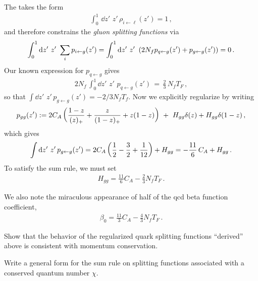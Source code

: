 \begin{example}
    The  takes the form
    \begin{align}
        \int_0^1\,\dd z'\,\, z'\,\rho_{i\leftarrow\ell}(z') = 1
        \,,
    \end{align}
    and therefore constrains the \textit{gluon splitting functions} via
\begin{align}
    \int_0^1 \dd z'
    \,\,
    z'
    \,\,
    \sum_i
    p_{i \leftarrow g}(z')
    =
    \int_0^1 \dd z'
    \,\,
    z'
    \,\,
    \left(
        2 N_f p_{q \leftarrow g}(z')
        +
        p_{g\leftarrow g}(z')
    \right)
    = 0
    \,.
\end{align}
%
Our known expression for \(p_{q\leftarrow g}\) gives
\begin{align}
    2 N_f \,\int_0^1 \dd z'\,\, z'\,\, p_{q \leftarrow g}(z')
    \,
    =
    \,
    \frac{2}{3}\,N_f T_F
    \,,
\end{align}
so that \(\int \dd z'\,\, z'\,p_{g\leftarrow g}(z') = -2/3 N_f T_f \).
%
Now we explicitly regularize by writing
\begin{align}
    p_{gg}(z')
    :=
    2 C_A \left(
        \frac{1-z}{(z)_+} + \frac{z}{(1-z)_+} + z(1-z)
    \right)
    \,\,
    +
    \,\,
    H_{gg}\delta(z) + H_{gg} \delta(1-z)
    \,,
\end{align}
which gives
\begin{align}
    \int \dd z'\,\, z'\,p_{g\leftarrow g}(z')
    =
    2 C_A \left(\frac{1}{2} - \frac{3}{2} + \frac{1}{12}\right)
    +
    H_{gg}
    =
    -\frac{11}{6}\,C_A + H_{gg}
    \,.
\end{align}
To satisfy the sum rule, we must set
\begin{align}
    H_{gg} = \frac{11}{6} C_A - \frac{2}{3} N_f T_F
    \,.
\end{align}

We also note the miraculous appearance of half of the \gls{qcd} beta function coefficient,
\begin{align}
    \beta_0 = \frac{11}{3} C_A - \frac{4}{3}N_f T_F
    \,.
\end{align}
\end{example}

\begin{exercise}
    Show that the behavior of the regularized quark splitting functions ``derived'' above is consistent with momentum conservation.
\end{exercise}

\begin{exercise}
    Write a general form for the sum rule on splitting functions associated with a conserved quantum number \(\chi\).
\end{exercise}



